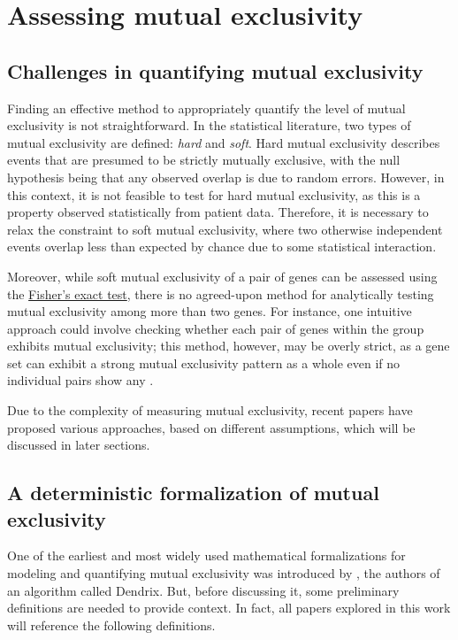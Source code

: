 \section{Assessing mutual exclusivity}

\subsection{Challenges in quantifying mutual exclusivity}

Finding an effective method to appropriately quantify the level of mutual exclusivity is not straightforward. In the statistical literature, two types of mutual exclusivity are defined: \textit{hard} and \textit{soft}. Hard mutual exclusivity describes events that are presumed to be strictly mutually exclusive, with the null hypothesis being that any observed overlap is due to random errors. However, in this context, it is not feasible to test for hard mutual exclusivity, as this is a property observed statistically from patient data. Therefore, it is necessary to relax the constraint to soft mutual exclusivity, where two otherwise independent events overlap less than expected by chance due to some statistical interaction.

Moreover, while soft mutual exclusivity of a pair of genes can be assessed using the \href{https://en.wikipedia.org/wiki/Fisher\%27s_exact_test}{Fisher's exact test}, there is no agreed-upon method for analytically testing mutual exclusivity among more than two genes. For instance, one intuitive approach could involve checking whether each pair of genes within the group exhibits mutual exclusivity; this method, however, may be overly strict, as a gene set can exhibit a strong mutual exclusivity pattern as a whole even if no individual pairs show any \cite{mutex}.

Due to the complexity of measuring mutual exclusivity, recent papers have proposed various approaches, based on different assumptions, which will be discussed in later sections.

\subsection{A deterministic formalization of mutual exclusivity}

One of the earliest \cite{survey} and most widely used mathematical formalizations for modeling and quantifying mutual exclusivity was introduced by \textcite{dendrix}, the authors of an algorithm called Dendrix. But, before discussing it, some preliminary definitions are needed to provide context. In fact, all papers explored in this work will reference the following definitions.

